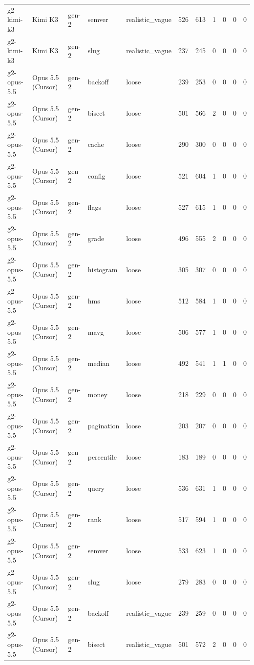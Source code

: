 \begin{tabular}{lllllllllll}
g2-kimi-k3 & Kimi K3 & gen-2 & semver & realistic\_vague & 526 & 613 & 1 & 0 & 0 & 0 \\
g2-kimi-k3 & Kimi K3 & gen-2 & slug & realistic\_vague & 237 & 245 & 0 & 0 & 0 & 0 \\
g2-opus-5.5 & Opus 5.5 (Cursor) & gen-2 & backoff & loose & 239 & 253 & 0 & 0 & 0 & 0 \\
g2-opus-5.5 & Opus 5.5 (Cursor) & gen-2 & bisect & loose & 501 & 566 & 2 & 0 & 0 & 0 \\
g2-opus-5.5 & Opus 5.5 (Cursor) & gen-2 & cache & loose & 290 & 300 & 0 & 0 & 0 & 0 \\
g2-opus-5.5 & Opus 5.5 (Cursor) & gen-2 & config & loose & 521 & 604 & 1 & 0 & 0 & 0 \\
g2-opus-5.5 & Opus 5.5 (Cursor) & gen-2 & flags & loose & 527 & 615 & 1 & 0 & 0 & 0 \\
g2-opus-5.5 & Opus 5.5 (Cursor) & gen-2 & grade & loose & 496 & 555 & 2 & 0 & 0 & 0 \\
g2-opus-5.5 & Opus 5.5 (Cursor) & gen-2 & histogram & loose & 305 & 307 & 0 & 0 & 0 & 0 \\
g2-opus-5.5 & Opus 5.5 (Cursor) & gen-2 & hms & loose & 512 & 584 & 1 & 0 & 0 & 0 \\
g2-opus-5.5 & Opus 5.5 (Cursor) & gen-2 & mavg & loose & 506 & 577 & 1 & 0 & 0 & 0 \\
g2-opus-5.5 & Opus 5.5 (Cursor) & gen-2 & median & loose & 492 & 541 & 1 & 1 & 0 & 0 \\
g2-opus-5.5 & Opus 5.5 (Cursor) & gen-2 & money & loose & 218 & 229 & 0 & 0 & 0 & 0 \\
g2-opus-5.5 & Opus 5.5 (Cursor) & gen-2 & pagination & loose & 203 & 207 & 0 & 0 & 0 & 0 \\
g2-opus-5.5 & Opus 5.5 (Cursor) & gen-2 & percentile & loose & 183 & 189 & 0 & 0 & 0 & 0 \\
g2-opus-5.5 & Opus 5.5 (Cursor) & gen-2 & query & loose & 536 & 631 & 1 & 0 & 0 & 0 \\
g2-opus-5.5 & Opus 5.5 (Cursor) & gen-2 & rank & loose & 517 & 594 & 1 & 0 & 0 & 0 \\
g2-opus-5.5 & Opus 5.5 (Cursor) & gen-2 & semver & loose & 533 & 623 & 1 & 0 & 0 & 0 \\
g2-opus-5.5 & Opus 5.5 (Cursor) & gen-2 & slug & loose & 279 & 283 & 0 & 0 & 0 & 0 \\
g2-opus-5.5 & Opus 5.5 (Cursor) & gen-2 & backoff & realistic\_vague & 239 & 259 & 0 & 0 & 0 & 0 \\
g2-opus-5.5 & Opus 5.5 (Cursor) & gen-2 & bisect & realistic\_vague & 501 & 572 & 2 & 0 & 0 & 0 \\

\end{tabular}
